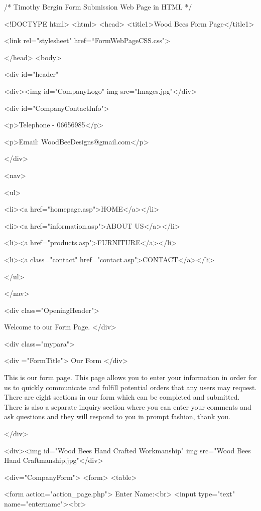 ﻿/* Timothy Bergin 
   Form Submission Web Page 
   in HTML
 */ 


<!DOCTYPE html>
<html>
<head>
<title1>Wood Bees Form Page</title1>

<link rel="stylesheet" href=“FormWebPageCSS.css"> 

</head>
<body>

 <div id="header"

    <div><img id="CompanyLogo" img src="Images\Logo.jpg"</div>

    <div id="CompanyContactInfo">

      <p>Telephone - 06656985</p>

      <p>Email: WoodBeeDesigns@gmail.com</p>

  </div>

    <nav>

      <ul>

        <li><a href="homepage.asp">HOME</a></li>

    	<li><a href="information.asp">ABOUT US</a></li>

    	<li><a href="products.asp">FURNITURE</a></li>

    	<li><a class="contact" href="contact.asp">CONTACT</a></li>

	  </ul>

    </nav>




<div class="OpeningHeader">

 Welcome to our Form Page. 
 </div> 





<div class="mypara"> 
     
	 <div ="FormTitle"> Our Form </div> 
	 
	 This is our form page. This page allows you to enter your information 
     in order for us to quickly communicate and fulfill potential orders 
     that any users may request. There are eight sections in our form which
	 can be completed and submitted. There is also a separate inquiry section 
     where you can enter your comments and ask questions and they will respond 
	 to you in prompt fashion, thank you. 	 

</div>

  <div><img id="Wood Bees Hand Crafted Workmanship" img src="Wood Bees Hand Craftmanship.jpg"</div> 


 <div="CompanyForm"> 
<form>
	<table> 
	 
	 <form action="action_page.php">
	 Enter Name:<br>
     <input type="text" name="entername"><br> 
	 
